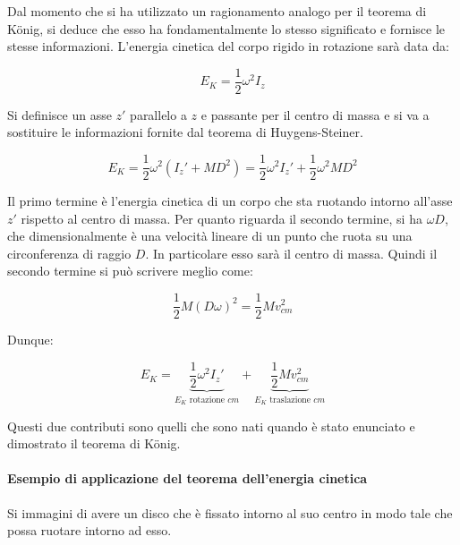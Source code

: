 Dal momento che si ha utilizzato un ragionamento analogo per il teorema di K\"onig, si deduce che esso ha fondamentalmente lo stesso significato e fornisce le stesse informazioni. L'energia cinetica del corpo rigido in rotazione sarà data da:

\[
	E_K = \frac{1}{2} \omega^2 I_z
\]

Si definisce un asse $z'$ parallelo a $z$ e passante per il centro di massa e si va a sostituire le informazioni fornite dal teorema di Huygens-Steiner.

\[
	E_K = \frac{1}{2} \omega^2 (I_z' + MD^2) = \frac{1}{2} \omega^2 I_z' + \frac{1}{2} \omega^2 MD^2
\]

Il primo termine è l'energia cinetica di un corpo che sta ruotando intorno all'asse $z'$ rispetto al centro di massa. Per quanto riguarda il secondo termine, si ha $\omega D$, che dimensionalmente è una velocità lineare di un punto che ruota su una circonferenza di raggio $D$. In particolare esso sarà il centro di massa. Quindi il secondo termine si può scrivere meglio come:

\[
	\frac{1}{2} M(D\omega)^2 = \frac{1}{2} Mv_{cm}^2
\]

Dunque:

\[
	E_K = \underbrace{\frac{1}{2} \omega^2 I_z'}_{E_K\text{ rotazione }cm  } + \underbrace{\frac{1}{2} Mv_{cm}^2}_{E_K\text{ traslazione } cm }
\]

Questi due contributi sono quelli che sono nati quando è stato enunciato e dimostrato il teorema di K\"onig.

\paragraph{Esempio di applicazione del teorema dell'energia cinetica} Si immagini di avere un disco che è fissato intorno al suo centro in modo tale che possa ruotare intorno ad esso.

